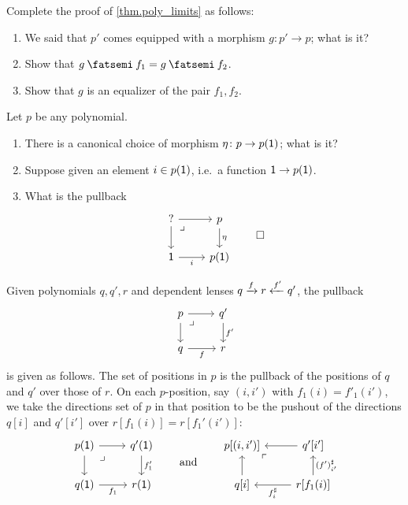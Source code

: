 \documentclass[DynamicalBook]{subfiles}
\begin{document}
\begin{exercise}\label{exc.poly_limits}
Complete the proof of \cref{thm.poly_limits} as follows:
\begin{enumerate}
	\item We said that $p'$ comes equipped with a morphism $g\colon p'\to p$; what is it?
	\item Show that $g\then f_1=g\then f_2$.
	\item Show that $g$ is an equalizer of the pair $f_1,f_2$.
\qedhere
\end{enumerate}
\end{exercise}

\begin{exercise}
Let $p$ be any polynomial.
\begin{enumerate}
	\item There is a canonical choice of morphism $\eta\colon p\to p(\textsf{1})$; what is it?
	\item Suppose given an element $i\in p(\textsf{1})$, i.e.\ a function $\textsf{1}\to p(\textsf{1})$.
	\item What is the pullback
	\[
	\begin{tikzcd}
	?\ar[r]\ar[d]&
	p\ar[d, "\eta"]\\
	\1\ar[r, "i"']&
	p(\1)\ar[ul, phantom, very near end, "\lrcorner"]
	\end{tikzcd}
	\qedhere
	\]
\end{enumerate}
\end{exercise}

\begin{example}\label{ex.pullbacks_in_poly}
Given polynomials $q,q',r$ and dependent lenses $q\xrightarrow{f} r\xleftarrow{f'} q'$, the pullback 
\[
\begin{tikzcd}
	p\ar[r]\ar[d]&
	q'\ar[d, "f'"]\\
	q\ar[r, "f"']&
	r\ar[ul, phantom, very near end, "\lrcorner"]
\end{tikzcd}
\]
 is given as follows. The set of positions in $p$ is the pullback of the positions of $q$ and $q'$ over those of $r$. On each $p$-position, say $(i, i')$ with $f_1(i)=f'_1(i')$, we take the directions set of $p$ in that position to be the  pushout of the directions $q[i]$ and $q'[i']$ over $r[f_1(i)]=r[f_1'(i')]$:
\begin{equation}\label{eqn.pullback_poly}
\begin{tikzcd}
	p(\1)\ar[r]\ar[d]&
	q'(\1)\ar[d, "f_1'"]\\
	q(\1)\ar[r, "f_1"']&
	r(\1)\ar[ul, phantom, very near end, "\lrcorner"]
\end{tikzcd}
\qqand
\begin{tikzcd}
	p[(i,i')]\ar[from=r]\ar[from=d]&
	q'[i']\ar[from=d, "(f')_{i'}^\sharp"']\\
	q[i]\ar[from=r, "f^\sharp_i"]&
	r[f_1(i)]\ar[ul, phantom, very near end, "\ulcorner"]
\end{tikzcd}
\end{equation}
\end{example}
\end{document}
